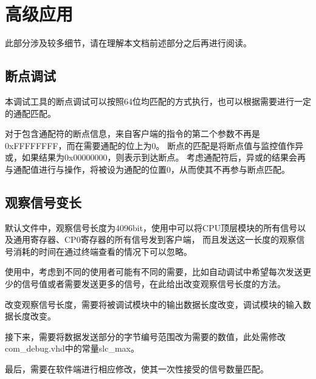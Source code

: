\section{高级应用}
    此部分涉及较多细节，请在理解本文档前述部分之后再进行阅读。
    \subsection{断点调试}
        本调试工具的断点调试可以按照64位均匹配的方式执行，也可以根据需要进行一定的通配匹配。

        对于包含通配符的断点信息，来自客户端的指令的第二个参数不再是0xFFFFFFFF，而在需要通配的位上为0。%
        断点的匹配是将断点值与监控值作异或，如果结果为0x00000000，则表示到达断点。%
        考虑通配符后，异或的结果会再与通配值进行与操作，将被设为通配的位置0，从而使其不再参与断点匹配。

    \subsection{观察信号变长}
        默认文件中，观察信号长度为4096bit，使用中可以将CPU顶层模块的所有信号以及通用寄存器、CP0寄存器的所有信号发到客户端，
        而且发送这一长度的观察信号消耗的时间在通过终端查看的情况下可以忽略。

        使用中，考虑到不同的使用者可能有不同的需要，比如自动调试中希望每次发送更少的信号值或者需要发送更多的信号，在此给出改变观察信号长度的方法。


        改变观察信号长度，需要将被调试模块中的输出数据长度改变，调试模块的输入数据长度改变。

        接下来，需要将数据发送部分的字节编号范围改为需要的数值，此处需修改com\_debug.vhd中的常量slc\_max。

        最后，需要在软件端进行相应修改，使其一次性接受的信号数量匹配。
